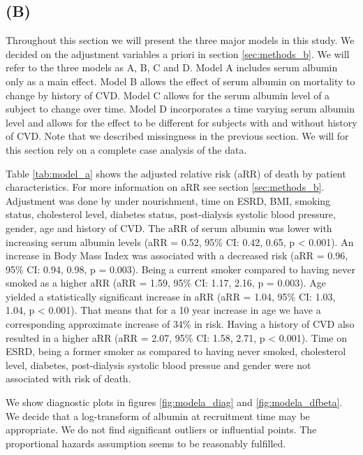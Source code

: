 \documentclass[paper=a4, fontsize=11pt]{scrartcl} %
\numberwithin{equation}{section} %
\numberwithin{figure}{section} %
\numberwithin{table}{section} %
\begin{document}
\subsection{(B)}
Throughout this section we will present the three major models in this study. We decided on the adjustment variables a priori in section \ref{sec:methods_b}. We will refer to the three models as A, B, C and D. Model A includes serum albumin only as a main effect. Model B allows the effect of serum albumin on mortality to change by history of CVD. Model C allows for the serum albumin level of a subject to change over time. Model D incorporates a time varying serum albumin level and allows for the effect to be different for subjects with and without history of CVD. Note that we described missingness in the previous section. We will for this section rely on a complete case analysis of the data.

Table \ref{tab:model_a} shows the adjusted relative risk (aRR) of death by patient characteristics. For more information on aRR see section \ref{sec:methods_b}. Adjustment was done by under nourishment, time on ESRD, BMI, smoking status, cholesterol level, diabetes status, post-dialysis systolic blood pressure, gender, age and history of CVD. The aRR of serum albumin was lower with increasing serum albumin levels (aRR = 0.52, 95\% CI: 0.42, 0.65, p < 0.001). An increase in Body Mass Index was associated with a decreased risk (aRR = 0.96, 95\% CI: 0.94, 0.98, p = 0.003). Being a current smoker compared to having never smoked as a higher aRR (aRR = 1.59, 95\% CI: 1.17, 2.16, p = 0.003). Age yielded a statistically significant increase in aRR (aRR = 1.04, 95\% CI: 1.03, 1.04, p < 0.001). That means that for a 10 year increase in age we have a corresponding approximate increase of 34\% in risk. Having a history of CVD also resulted in a higher aRR (aRR = 2.07, 95\% CI: 1.58, 2.71, p < 0.001). Time on ESRD, being a former smoker as compared to having never smoked, cholesterol level, diabetes, post-dialysis systolic blood pressue and gender were not associated with risk of death.

We show diagnostic plots in figures \ref{fig:modela_diag} and \ref{fig:modela_dfbeta}. We decide that a log-transform of albumin at recruitment time may be appropriate. We do not find significant outliers or influential points. The proportional hazards assumption seems to be reasonably fulfilled.
\end{document}
